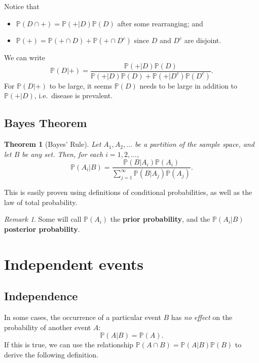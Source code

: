 \documentclass[
]{book}
\providecommand{\tightlist}{%
  \setlength{\itemsep}{0pt}\setlength{\parskip}{0pt}}
\newcommand{\bbP}{\mathbb{P}}
\newtheorem{theorem}{Theorem}[chapter]
\theoremstyle{definition}
\theoremstyle{definition}
\theoremstyle{definition}
\theoremstyle{definition}
\theoremstyle{remark}
\newtheorem*{remark}{Remark}
\begin{document}
Notice that

\begin{itemize}
\tightlist
\item
  \(\bbP(D \cap +) = \bbP(+|D)\bbP(D)\) after some rearranging; and
\item
  \(\bbP(+) = \bbP(+ \cap D) + \bbP(+ \cap D^c)\) since \(D\) and \(D^c\) are disjoint.
\end{itemize}

We can write
\[
\bbP(D|+) = \frac{\bbP(+|D)\bbP(D)}{\bbP(+|D)\bbP(D) + \bbP(+|D^c)\bbP(D^c)}.
\]
For \(\bbP(D|+)\) to be large, it seems \(\bbP(D)\) needs to be large in addition to \(\bbP(+|D)\), i.e.~disease is prevalent.

\hypertarget{bayes-theorem}{%
\subsection{Bayes Theorem}\label{bayes-theorem}}

\begin{theorem}[Bayes' Rule]
Let \(A_1,A_2,\dots\) be a partition of the sample space, and let \(B\) be any set.
Then, for each \(i=1,2,\dots\),
\[
  \bbP(A_i|B) = \frac{\bbP(B|A_i)\bbP(A_i)}{\sum_{j=1}^\infty \bbP(B|A_j)\bbP(A_j)}.
\]
\end{theorem}

This is easily proven using definitions of conditional probabilities, as well as the law of total probability.

\begin{remark}
Some will call \(\bbP(A_i)\) the \textbf{prior probability}, and the \(\bbP(A_i|B)\) \textbf{posterior probability}.
\end{remark}

\hypertarget{independent-events}{%
\section{Independent events}\label{independent-events}}

\hypertarget{independence}{%
\subsection{Independence}\label{independence}}

In some cases, the occurrence of a particular event \(B\) has \emph{no effect} on the probability of another event \(A\):
\[
  \bbP(A | B) = \bbP(A).
\]
If this is true, we can use the relationship \(\bbP(A \cap B) = \bbP(A | B)\bbP(B)\) to derive the following definition.
\end{document}
